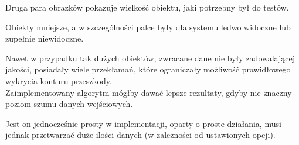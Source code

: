 Druga para obrazków pokazuje wielkość obiektu, jaki potrzebny był do testów.

Obiekty mniejsze, a w szczególności palce były dla systemu ledwo widoczne lub zupełnie niewidoczne.

Nawet w przypadku tak dużych obiektów, zwracane dane nie były zadowalającej jakości, posiadały wiele przekłamań, które ograniczały możliwość prawidłowego wykrycia konturu przeszkody.\\

Zaimplementowany algorytm mógłby dawać lepsze rezultaty, gdyby nie znaczny poziom szumu danych wejściowych.

Jest on jednocześnie prosty w implementacji, oparty o proste działania, musi jednak przetwarzać duże ilości danych (w zależności od ustawionych opcji).

